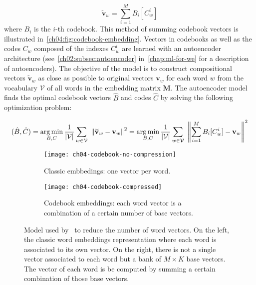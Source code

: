     \begin{equation}
      \widetilde{\mathbf{v}}_w = \sum_{i=1}^M B_i[C^i_w]
    \end{equation}
    where $B_i$ is the $i$-th codebook. This method of summing codebook vectors
    is illustrated in~\autoref{ch04:fig:codebook-embedding}. Vectors in
    codebooks as well as the codes $C_w$ composed of the indexes $C^i_w$ are
    learned with an autoencoder architecture
    (see~\autoref{ch02:subsec:autoencoder} in~\autoref{chap:ml-for-we} for a
    description of autoencoders). The objective of the model is to construct
    compositional vectors $\widetilde{\mathbf{v}}_w$ as close as possible to
    original vectors $\mathbf{v}_w$ for each word $w$ from the vocabulary
    $\mathcal{V}$ of all words in the embedding matrix $\mathbf{M}$. The
    autoencoder model finds the optimal codebook vectors $\hat{B}$ and codes
    $\hat{C}$ by solving the following optimization problem:

    \begin{equation}
      (\hat{B}, \hat{C}) = \operatorname*{arg\,min}_{B, C} \frac{1}{|\mathcal{V}|}
      \sum_{w \in \mathcal{V}}~
      {\left\lVert \widetilde{\mathbf{v}}_w - \mathbf{v}_w \right\rVert}^2
                         = \operatorname*{arg\,min}_{B, C} \frac{1}{|\mathcal{V}|}
      \sum_{w \in \mathcal{V}}~
      {\left\lVert \sum_{i=1}^M B_i[C^i_w] - \mathbf{v}_w \right\rVert}^2
    \end{equation}
    \medskip

    \begin{figure}[t]
      \centering
      \begin{subfigure}[t]{0.49\textwidth}
        \centering
        \texttt{[image: ch04-codebook-no-compression]}
        \caption{Classic embbedings: one vector per word.}
      \end{subfigure} \hfill
      \begin{subfigure}[t]{0.49\textwidth}
        \centering
        \texttt{[image: ch04-codebook-compressed]}
        \caption{Codebook embeddings: each word vector is a combination of a
        certain number of base vectors.}
      \end{subfigure}
      \caption[Model used by~\citeauthor{shu2018compressing} to reduce the
      number of word vectors.]{Model used by~\citep{shu2018compressing} to
      reduce the number of word vectors. On the left, the classic word
      embeddings representation where each word is associated to its own vector.
      On the right, there is not a single vector associated to each word but a
      bank of $M \times K$ base vectors. The vector of each word is be computed
      by summing a certain combination of those base vectors.}
      \label{ch04:fig:codebook-embedding}
    \end{figure}

